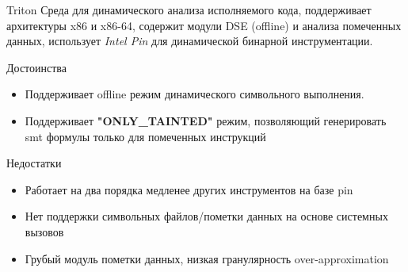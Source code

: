\documentclass[10pt]{beamer}
\begin{document}
\begin{frame}{Triton}
    Среда для динамического анализа исполняемого кода, поддерживает архитектуры x86 и x86-64, содержит модули DSE (offline) и анализа помеченных данных, использует \emph{Intel Pin} для динамической бинарной инструментации.
    \begin{block}{Достоинства}
        \begin{itemize}
        \item Поддерживает offline режим динамического символьного выполнения.
        \item Поддерживает \textbf{"ONLY\_TAINTED"} режим, позволяющий генерировать smt формулы только для помеченных инструкций
        \end{itemize}
    \end{block}

      \begin{block}{Недостатки}
          \begin{itemize}
      \item Работает на два порядка медленее других инструментов на базе pin
      \item Нет поддержки символьных файлов/пометки данных на основе системных вызовов
      \item Грубый модуль пометки данных, низкая гранулярность over-approximation
      \end{itemize}
    \end{block}

\end{frame}

\end{document}
